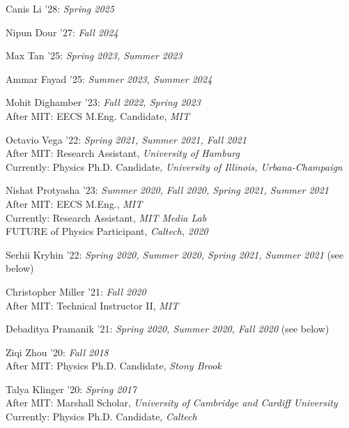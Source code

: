 \bbl

\item Canis Li '28: \emph{Spring 2025}

\item Nipun Dour '27: \emph{Fall 2024}

\item Max Tan '25: \emph{Spring 2023, Summer 2023}

\item Ammar Fayad '25: \emph{Summer 2023, Summer 2024}

\item Mohit Dighamber '23: \emph{Fall 2022, Spring 2023}
\\ After MIT: EECS M.Eng. Candidate, \emph{MIT}

\item Octavio Vega '22: \emph{Spring 2021, Summer 2021, Fall 2021}
\\ After MIT: Research Assistant, \emph{University of Hamburg}
\\ Currently: Physics Ph.D. Candidate, \emph{University of Illinois, Urbana-Champaign}

\item Nishat Protyasha '23: \emph{Summer 2020, Fall 2020, Spring 2021, Summer 2021}
\\ After MIT: EECS M.Eng., \emph{MIT}
\\ Currently: Research Assistant, \emph{MIT Media Lab}
\\ FUTURE of Physics Participant, \emph{Caltech, 2020}

\item Serhii Kryhin '22: \emph{Spring 2020, Summer 2020, Spring 2021, Summer 2021} (see below) 

\item Christopher Miller '21: \emph{Fall 2020}
\\ After MIT: Technical Instructor II, \emph{MIT}

\item Debaditya Pramanik '21: \emph{Spring 2020, Summer 2020, Fall 2020} (see below) 

\item Ziqi Zhou '20: \emph{Fall 2018}
\\ After MIT: Physics Ph.D. Candidate, \emph{Stony Brook}

\item Talya Klinger '20: \emph{Spring 2017}
\\ After MIT: Marshall Scholar, \emph{University of Cambridge and Cardiff University}
\\ Currently: Physics Ph.D. Candidate, \emph{Caltech}

